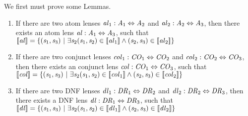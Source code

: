 We first must prove some Lemmas.

\begin{lemma}\leavevmode
\label{lem:composition-completeness}
\begin{enumerate}
\item If there are two atom lenses
$\mathit{al}_1 : \mathit{A}_1 \Leftrightarrow \mathit{A}_2$ and
$\mathit{al}_2 : \mathit{A}_2 \Leftrightarrow \mathit{A}_3$,
then there exists an atom lens
$\mathit{al} : \mathit{A}_1 \Leftrightarrow \mathit{A}_3$, such that
$[ \! [\mathit{al}] \! ]=\{(\mathit{s}_1,\mathit{s}_3)~|~
\exists\mathit{s}_2
(\mathit{s}_1,\mathit{s}_2)\in[ \! [\mathit{al}_1] \! ]\wedge
(\mathit{s}_2,\mathit{s}_3)\in[ \! [\mathit{al}_2] \! ]\}$

\item If there are two conjunct lenses
$\mathit{col}_1 : \mathit{CO}_1 \Leftrightarrow \mathit{CO}_2$ and
$\mathit{col}_2 : \mathit{CO}_2 \Leftrightarrow \mathit{CO}_3$,
then there exists an conjunct lens
$\mathit{col} : \mathit{CO}_1 \Leftrightarrow \mathit{CO}_3$, such that
$[ \! [\mathit{col}] \! ]=\{(\mathit{s}_1,\mathit{s}_3)~|~
\exists\mathit{s}_2
(\mathit{s}_1,\mathit{s}_2)\in[ \! [\mathit{col}_1] \! ]\wedge
(\mathit{s}_2,\mathit{s}_3)\in[ \! [\mathit{col}_2] \! ]\}$

\item If there are two DNF lenses
$\mathit{dl}_1 : \mathit{DR}_1 \Leftrightarrow \mathit{DR}_2$ and
$\mathit{dl}_2 : \mathit{DR}_2 \Leftrightarrow \mathit{DR}_3$,
then there exists a DNF lens
$\mathit{dl} : \mathit{DR}_1 \Leftrightarrow \mathit{DR}_3$, such that
$[ \! [\mathit{dl}] \! ]=\{(\mathit{s}_1,\mathit{s}_3)~|~
\exists\mathit{s}_2
(\mathit{s}_1,\mathit{s}_2)\in[ \! [\mathit{dl}_1] \! ]\wedge
(\mathit{s}_2,\mathit{s}_3)\in[ \! [\mathit{dl}_2] \! ]\}$
\end{enumerate}
\end{lemma}

